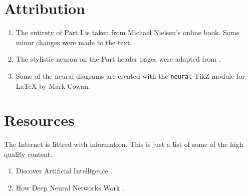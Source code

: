 \section*{Attribution}

\begin{enumerate}
\item 
The entirety of Part I is taken from Michael Nielsen's online book\cite{Nielsen2015}. Some minor changes were made to the text.

\item
The stylistic neuron on the Part header pages were adapted from \cite{Erler2004}. 

\item
Some of the neural diagrams  are created with the \lstinline{neural} TikZ module for \LaTeX{}\cite{cowan2019} by Mark Cowan.
\end{enumerate}

\section*{Resources}

The Internet is littred with information.  This is just a list of some of the high quality content.

\begin{enumerate}
\item Discover Artificial Intelligence \cite{AnkitGupta2019}.
\item How Deep Neural Networks Work  \cite{BrandonRohrer2019}.
\end{enumerate} 